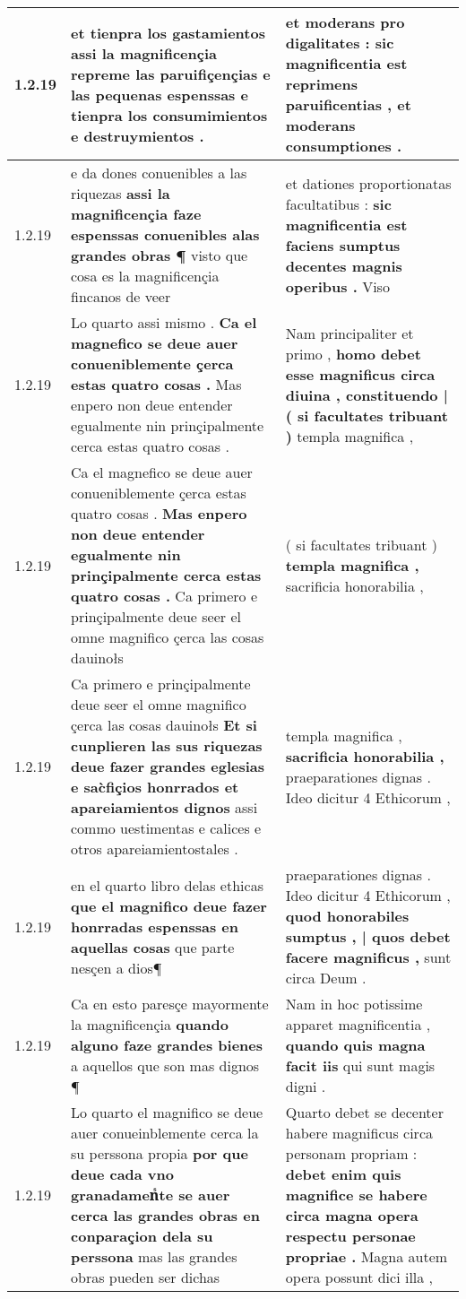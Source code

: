 \begin{tabular}{|p{1cm}|p{6.5cm}|p{6.5cm}|}
1.2.19 & et tienpra los gastamientos \textbf{ assi la magnificençia repreme las paruifiçençias e las pequenas espenssas } e tienpra los consumimientos e destruymientos . & et moderans pro digalitates : \textbf{ sic magnificentia est reprimens paruificentias , } et moderans consumptiones . \\\hline
1.2.19 & e da dones conuenibles a las riquezas \textbf{ assi la magnificençia faze espenssas conuenibles alas grandes obras ¶ } visto que cosa es la magnificençia fincanos de veer & et dationes proportionatas facultatibus : \textbf{ sic magnificentia est faciens sumptus decentes magnis operibus . } Viso \\\hline
1.2.19 & Lo quarto assi mismo . \textbf{ Ca el magnefico se deue auer conueniblemente çerca estas quatro cosas . } Mas enpero non deue entender egualmente nin prinçipalmente cerca estas quatro cosas . & Nam principaliter et primo , \textbf{ homo debet esse magnificus circa diuina , constituendo | ( si facultates tribuant ) } templa magnifica , \\\hline
1.2.19 & Ca el magnefico se deue auer conueniblemente çerca estas quatro cosas . \textbf{ Mas enpero non deue entender egualmente nin prinçipalmente cerca estas quatro cosas . } Ca primero e prinçipalmente deue seer el omne magnifico çerca las cosas dauinołs & ( si facultates tribuant ) \textbf{ templa magnifica , } sacrificia honorabilia , \\\hline
1.2.19 & Ca primero e prinçipalmente deue seer el omne magnifico çerca las cosas dauinołs \textbf{ Et si cunplieren las sus riquezas deue fazer grandes eglesias e sac̀fiçios honrrados et apareiamientos dignos } assi commo uestimentas e calices e otros apareiamientostales . & templa magnifica , \textbf{ sacrificia honorabilia , } praeparationes dignas . Ideo dicitur 4 Ethicorum , \\\hline
1.2.19 & en el quarto libro delas ethicas \textbf{ que el magnifico deue fazer honrradas espenssas en aquellas cosas } que parte nesçen a dios¶ & praeparationes dignas . Ideo dicitur 4 Ethicorum , \textbf{ quod honorabiles sumptus , | quos debet facere magnificus , } sunt circa Deum . \\\hline
1.2.19 & Ca en esto paresçe mayormente la magnificençia \textbf{ quando alguno faze grandes bienes } a aquellos que son mas dignos ¶ & Nam in hoc potissime apparet magnificentia , \textbf{ quando quis magna facit iis } qui sunt magis digni . \\\hline
1.2.19 & Lo quarto el magnifico se deue auer conueinblemente cerca la su perssona propia \textbf{ por que deue cada vno granadamenᷤte se auer cerca las grandes obras en conparaçion dela su perssona } mas las grandes obras pueden ser dichas & Quarto debet se decenter habere magnificus circa personam propriam : \textbf{ debet enim quis magnifice se habere circa magna opera respectu personae propriae . } Magna autem opera possunt dici illa , \\\hline

\end{tabular}
